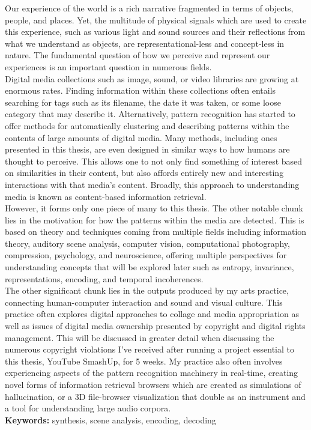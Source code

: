 \documentclass[a4paper,11pt,twoside]{ThesisStyle}
\begin{document}
Our experience of the world is a rich narrative fragmented in terms of objects, people, and places.  Yet, the multitude of physical signals which are used to create this experience, such as various light and sound sources and their reflections from what we understand as objects, are representational-less and concept-less in nature.  The fundamental question of how we perceive and represent our experiences is an important question in numerous fields.
\\
Digital media collections such as image, sound, or video libraries are growing at enormous rates.  Finding information within these collections often entails searching for tags such as its filename, the date it was taken, or some loose category that may describe it.  Alternatively, pattern recognition has started to offer methods for automatically clustering and describing patterns within the contents of large amounts of digital media.  Many methods, including ones presented in this thesis, are even designed in similar ways to how humans are thought to perceive.  This allows one to not only find something of interest based on similarities in their content, but also affords entirely new and interesting interactions with that media's content.  Broadly, this approach to understanding media is known as content-based information retrieval.  
\\
However, it forms only one piece of many to this thesis.  The other notable chunk lies in the motivation for how the patterns within the media are detected.  This is based on theory and techniques coming from multiple fields including information theory, auditory scene analysis, computer vision, computational photography, compression, psychology, and neuroscience, offering multiple perspectives for understanding concepts that will be explored later such as entropy, invariance, representations, encoding, and temporal incoherences.  
\\
The other significant chunk lies in the outputs produced by my arts practice, connecting human-computer interaction and sound and visual culture.  This practice often explores digital approaches to collage and media appropriation as well as issues of digital media ownership presented by copyright and digital rights management.  This will be discussed in greater detail when discussing the numerous copyright violations I've received after running a project essential to this thesis, YouTube SmashUp, for 5 weeks.  My practice also often involves experiencing aspects of the pattern recognition machinery in real-time, creating novel forms of information retrieval browsers which are created as simulations of hallucination, or a 3D file-browser visualization that double as an instrument and a tool for understanding large audio corpora.  
\\
{\large\textbf{Keywords:}}
synthesis, scene analysis, encoding, decoding







\appendix



\end{document}
